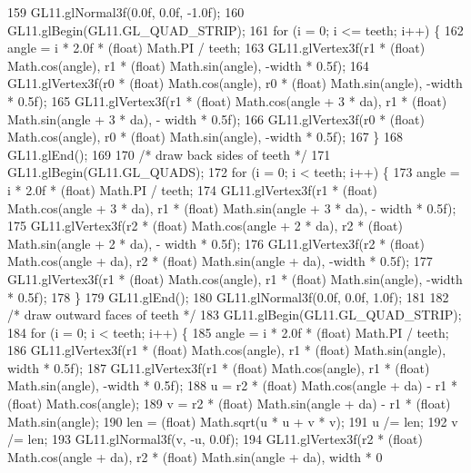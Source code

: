\begin{DoxyCode}
159         GL11.glNormal3f(0.0f, 0.0f, -1.0f);
160         GL11.glBegin(GL11.GL\_QUAD\_STRIP);
161         \textcolor{keywordflow}{for} (i = 0; i <= teeth; i++) \{
162             angle = i * 2.0f * (float) Math.PI / teeth;
163             GL11.glVertex3f(r1 * (\textcolor{keywordtype}{float}) Math.cos(angle), r1 * (float) Math.sin(angle), -width * 0.5f);
164             GL11.glVertex3f(r0 * (\textcolor{keywordtype}{float}) Math.cos(angle), r0 * (float) Math.sin(angle), -width * 0.5f);
165             GL11.glVertex3f(r1 * (\textcolor{keywordtype}{float}) Math.cos(angle + 3 * da), r1 * (float) Math.sin(angle + 3 * da), -
      width * 0.5f);
166             GL11.glVertex3f(r0 * (\textcolor{keywordtype}{float}) Math.cos(angle), r0 * (float) Math.sin(angle), -width * 0.5f);
167         \}
168         GL11.glEnd();
169 
170         \textcolor{comment}{/* draw back sides of teeth */}
171         GL11.glBegin(GL11.GL\_QUADS);
172         \textcolor{keywordflow}{for} (i = 0; i < teeth; i++) \{
173             angle = i * 2.0f * (float) Math.PI / teeth;
174             GL11.glVertex3f(r1 * (\textcolor{keywordtype}{float}) Math.cos(angle + 3 * da), r1 * (float) Math.sin(angle + 3 * da), -
      width * 0.5f);
175             GL11.glVertex3f(r2 * (\textcolor{keywordtype}{float}) Math.cos(angle + 2 * da), r2 * (float) Math.sin(angle + 2 * da), -
      width * 0.5f);
176             GL11.glVertex3f(r2 * (\textcolor{keywordtype}{float}) Math.cos(angle + da), r2 * (float) Math.sin(angle + da), -width * 
      0.5f);
177             GL11.glVertex3f(r1 * (\textcolor{keywordtype}{float}) Math.cos(angle), r1 * (float) Math.sin(angle), -width * 0.5f);
178         \}
179         GL11.glEnd();
180         GL11.glNormal3f(0.0f, 0.0f, 1.0f);
181 
182         \textcolor{comment}{/* draw outward faces of teeth */}
183         GL11.glBegin(GL11.GL\_QUAD\_STRIP);
184         \textcolor{keywordflow}{for} (i = 0; i < teeth; i++) \{
185             angle = i * 2.0f * (float) Math.PI / teeth;
186             GL11.glVertex3f(r1 * (\textcolor{keywordtype}{float}) Math.cos(angle), r1 * (float) Math.sin(angle), width * 0.5f);
187             GL11.glVertex3f(r1 * (\textcolor{keywordtype}{float}) Math.cos(angle), r1 * (float) Math.sin(angle), -width * 0.5f);
188             u = r2 * (float) Math.cos(angle + da) - r1 * (float) Math.cos(angle);
189             v = r2 * (float) Math.sin(angle + da) - r1 * (float) Math.sin(angle);
190             len = (float) Math.sqrt(u * u + v * v);
191             u /= len;
192             v /= len;
193             GL11.glNormal3f(v, -u, 0.0f);
194             GL11.glVertex3f(r2 * (\textcolor{keywordtype}{float}) Math.cos(angle + da), r2 * (float) Math.sin(angle + da), width * 0

\end{DoxyCode}
